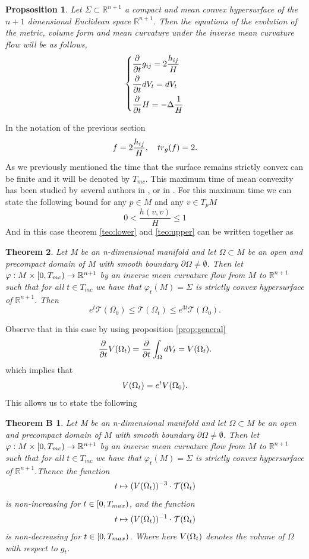 \documentclass{amsart}
\newtheorem*{samelettertheoremB}{ Theorem B}
\newtheorem{theorem}{Theorem}[section]
\newtheorem{proposition}[theorem]{Propsosition}
\theoremstyle{definition}
\theoremstyle{remark}
\newcommand{\tr}{{\rm tr}}
\newcommand{\V}{{\rm V}}
\begin{document}
\begin{proposition}\label{prop:volution_equations}
Let $\Sigma\subset \mathbb{R}^{n+1}$ a compact and mean convex hypersurface of the $n+1$ dimensional Euclidean space $\mathbb{R}^{n+1}$. Then the equations of the evolution of the metric, volume form and mean curvature under the inverse mean curvature flow will be as follows,
       \begin{equation}
        \left\lbrace\begin{aligned}
            &\frac{\partial}{\partial t}g_{ij}=2\frac{h_{ij}}{H}\\
            &\frac{\partial}{\partial t}d{\rm V}_t=d{\rm V}_t\\
            &\frac{\partial}{\partial t}H=-\Delta \frac{1}{H}
        \end{aligned}\right.
    \end{equation} 
\end{proposition}
In the notation of the previous section 
$$
f=2\frac{h_{ij}}{H},\quad \tr_g(f)=2.
$$
As we previously mentioned the time that the surface remains strictly convex can be finite and it will be denoted by $T_{mc}$. This maximum time of mean convexity has been studied by several authors in \cite{maxtime}, \cite{Lambert2016inver-34677} or in \cite{Urbas}. For this maximum time we can state the following bound for any $p\in M$ and any $v\in T_pM$
$$
0<\frac{h(v,v)}{H}\leq 1
$$
And in this case theorem \ref{teo:lower} and \ref{teo:upper} can be written together as
\begin{theorem}
Let M be an n-dimensional manifold and let $\Omega\subset M$ be an open and precompact domain of $M$ with smooth boundary $\partial \Omega\neq \emptyset$. Then let
    $\varphi:M\times[0,T_{\rm mc })\to \mathbb{R}^{n+1}$ by an inverse mean curvature flow from $M$ to $\mathbb{R}^{n+1}$ such that for all $t\in T_{mc}$ we have that $\varphi_t(M)=\Sigma$ is strictly  convex hypersurface of $\mathbb{R}^{n+1}$.     
    Then
 $$
 e^{t}\mathcal{T}(\Omega_0)\leq \mathcal{T}(\Omega_t)\leq e^{3t}\mathcal{T}(\Omega_0).
 $$   
\end{theorem}
Observe that in this case by using proposition \ref{prop:general}
$$
    \frac{\partial}{\partial t}\V(\Omega_t) =\frac{\partial}{\partial t} \int_{\Omega} d\V_t = \V(\Omega_t).
    $$
which implies that
$$
\V(\Omega_t)=e^t\V(\Omega_0).
$$
This allows us to state the following
\begin{samelettertheoremB}
   Let M be an n-dimensional manifold and let $\Omega\subset M$ be an open and precompact domain of $M$ with smooth boundary $\partial \Omega\neq \emptyset$. Then let
    $\varphi:M\times[0,T_{\rm mc })\to \mathbb{R}^{n+1}$ by an inverse mean curvature flow from $M$ to $\mathbb{R}^{n+1}$ such that for all $t\in T_{mc}$ we have that $\varphi_t(M)=\Sigma$ is strictly  convex hypersurface of $\mathbb{R}^{n+1}$.Thence the function
    $$
 t\mapsto ({\rm V}(\Omega_t))^{-3}\cdot\mathcal{T}(\Omega_t)
    $$
    is non-increasing for $t\in [0,T_{\rm max})$, and the function
    $$
 t\mapsto ({\rm V}(\Omega_t))^{-1}\cdot\mathcal{T}(\Omega_t)
    $$
    is non-decreasing for $t\in [0,T_{\rm max})$. Where here  ${\rm V}(\Omega_t)$ denotes the volume of $\Omega$ with respect to $g_t$.
\end{samelettertheoremB}
\end{document}

